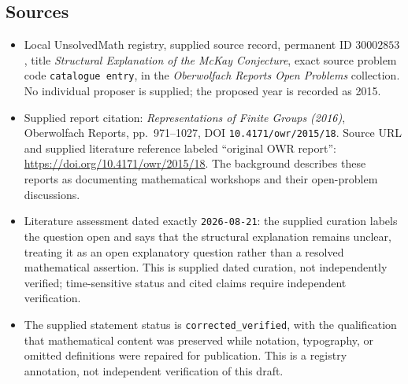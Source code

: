 \documentclass[11pt]{article}
\begin{document}
\subsection{Sources}
\begin{itemize}
\item Local UnsolvedMath registry, supplied source record, permanent ID \(30002853\), title \emph{Structural Explanation of the McKay Conjecture}, exact source problem code \texttt{catalogue entry}, in the \emph{Oberwolfach Reports Open Problems} collection. No individual proposer is supplied; the proposed year is recorded as 2015.
\item Supplied report citation: \emph{Representations of Finite Groups (2016)}, Oberwolfach Reports, pp.~971--1027, DOI \texttt{10.4171/owr/2015/18}. Source URL and supplied literature reference labeled ``original OWR report'': \url{https://doi.org/10.4171/owr/2015/18}. The background describes these reports as documenting mathematical workshops and their open-problem discussions.
\item Literature assessment dated exactly \texttt{2026-08-21}: the supplied curation labels the question open and says that the structural explanation remains unclear, treating it as an open explanatory question rather than a resolved mathematical assertion. This is supplied dated curation, not independently verified; time-sensitive status and cited claims require independent verification.
\item The supplied statement status is \texttt{corrected\_verified}, with the qualification that mathematical content was preserved while notation, typography, or omitted definitions were repaired for publication. This is a registry annotation, not independent verification of this draft.
\end{itemize}
\end{document}
